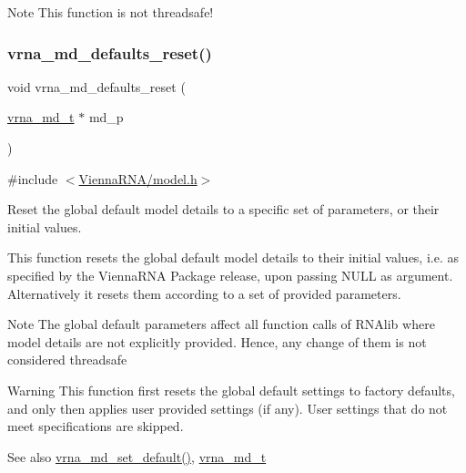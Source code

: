 \begin{DoxyNote}{Note}
This function is not threadsafe! 
\end{DoxyNote}
\mbox{\label{group__model__details_ga70834424cf804d149937de89f80ceb45}} 
\subsubsection{\texorpdfstring{vrna\_md\_defaults\_reset()}{vrna\_md\_defaults\_reset()}}
{\footnotesize\ttfamily void vrna\+\_\+md\+\_\+defaults\+\_\+reset (\begin{DoxyParamCaption}\item[{\mbox{\hyperlink{group__model__details_ga1f8a10e12a0a1915f2a4eff0b28ea17c}{vrna\+\_\+md\+\_\+t}} $\ast$}]{md\+\_\+p }\end{DoxyParamCaption})}



{\ttfamily \#include $<$\mbox{\hyperlink{model_8h}{Vienna\+R\+N\+A/model.\+h}}$>$}



Reset the global default model details to a specific set of parameters, or their initial values. 

This function resets the global default model details to their initial values, i.\+e. as specified by the Vienna\+R\+NA Package release, upon passing N\+U\+LL as argument. Alternatively it resets them according to a set of provided parameters.

\begin{DoxyNote}{Note}
The global default parameters affect all function calls of R\+N\+Alib where model details are not explicitly provided. Hence, any change of them is not considered threadsafe 
\end{DoxyNote}
\begin{DoxyWarning}{Warning}
This function first resets the global default settings to factory defaults, and only then applies user provided settings (if any). User settings that do not meet specifications are skipped. 
\end{DoxyWarning}
\begin{DoxySeeAlso}{See also}
\mbox{\hyperlink{group__model__details_ga8ac6ff84936282436f822644bf841f66}{vrna\+\_\+md\+\_\+set\+\_\+default()}}, \mbox{\hyperlink{group__model__details_ga1f8a10e12a0a1915f2a4eff0b28ea17c}{vrna\+\_\+md\+\_\+t}}
\end{DoxySeeAlso}

